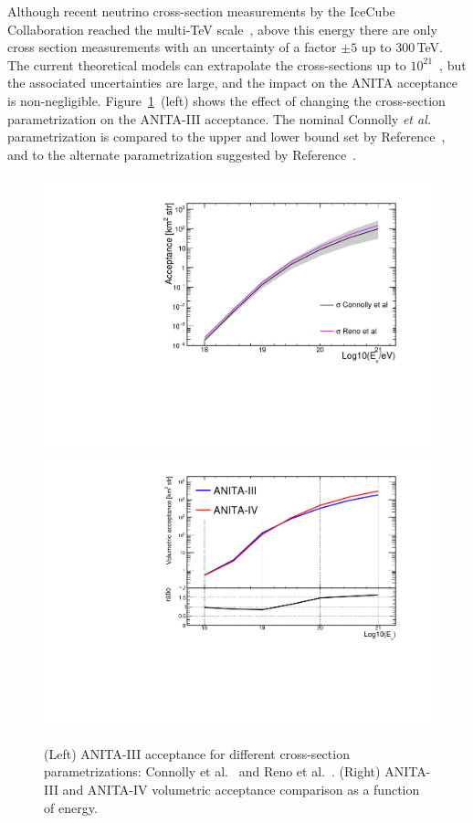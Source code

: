 Although recent neutrino cross-section measurements by the IceCube
Collaboration reached the multi-TeV
scale~\cite{aartsen2017measurement,bustamante2017measurement}, 
above this energy there are
only cross section measurements with an uncertainty of a factor $\pm 5$ up to
300\,TeV.
The current theoretical models can extrapolate the cross-sections up to $10^{21}$\ev~\cite{PhysRevD.83.113009,reno2005high},
but the associated uncertainties are
large, and the impact on the ANITA acceptance is
non-negligible.
Figure~\ref{fig:acceptanceVSxsec}~(left) shows the effect of changing the
cross-section parametrization on the ANITA-III acceptance.
The nominal Connolly {\it et al.} parametrization is compared to the upper and lower bound set by
Reference~\cite{PhysRevD.83.113009}, and to the alternate
parametrization suggested by Reference~\cite{reno2005high}.


\begin{figure}[!h]\centering
  \includegraphics[width=.45\linewidth]{./Figs/AcceptanceVScrossSectionParam_ANITA3.pdf}
  \includegraphics[width=.45\linewidth]{./Figs/CompareEffVol_A3vsA4.pdf}
  \caption{(Left) ANITA-III acceptance for different cross-section parametrizations: Connolly et al.~\cite{PhysRevD.83.113009} and Reno et al.~\cite{reno2005high}. (Right) ANITA-III and ANITA-IV volumetric acceptance comparison as a function of energy.}
  \label{fig:acceptanceVSxsec}
\end{figure}


